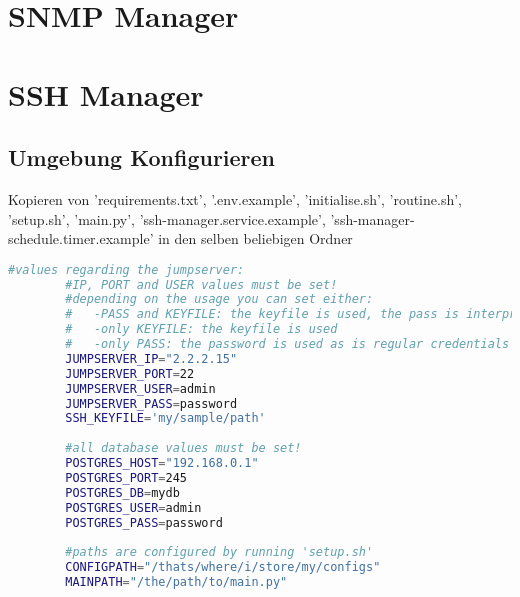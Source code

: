 \documentclass{article}
\begin{document}
	\section{SNMP Manager}
	\newpage
	
	\section{SSH Manager}
	\subsection[file config]{Umgebung Konfigurieren}
	
	Kopieren von 'requirements.txt', '.env.example', 'initialise.sh', 'routine.sh', 'setup.sh', 'main.py', 'ssh-manager.service.example', 'ssh-manager-schedule.timer.example' in den selben beliebigen Ordner 
	
	\lstset{style=files}
	\begin{lstlisting}[caption={Anhand von '.env.example' eigene '.env' Datei anlegen}, language=bash]
		#values regarding the jumpserver:
		#IP, PORT and USER values must be set!
		#depending on the usage you can set either:
		#   -PASS and KEYFILE: the keyfile is used, the pass is interpreted as the passphrase
		#   -only KEYFILE: the keyfile is used
		#   -only PASS: the password is used as is regular credentials
		JUMPSERVER_IP="2.2.2.15"
		JUMPSERVER_PORT=22
		JUMPSERVER_USER=admin
		JUMPSERVER_PASS=password
		SSH_KEYFILE='my/sample/path'
		
		#all database values must be set!
		POSTGRES_HOST="192.168.0.1"
		POSTGRES_PORT=245
		POSTGRES_DB=mydb
		POSTGRES_USER=admin
		POSTGRES_PASS=password
		
		#paths are configured by running 'setup.sh'
		CONFIGPATH="/thats/where/i/store/my/configs"
		MAINPATH="/the/path/to/main.py"
	\end{lstlisting}
	
	\newpage
\end{document}
